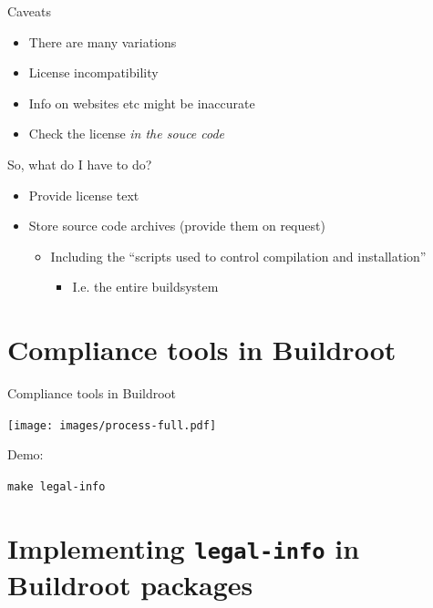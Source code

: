 \documentclass[xetex,table,table]{beamer}
\begin{document}
\begin{frame}{Caveats}
  \begin{itemize}
  \item There are many variations
  \item License incompatibility
  \item Info on websites etc might be inaccurate
  \item[\textrightarrow] Check the license {\em in the souce code}
  \end{itemize}
\end{frame}

\begin{frame}{So, what do I have to do?}
  \begin{itemize}
  \item Provide license text
  \item Store source code archives (provide them on request)
    \begin{itemize}
    \item Including the ``scripts used to control compilation and
      installation''
      \begin{itemize}
      \item I.e. the entire buildsystem
      \end{itemize}
    \end{itemize}
  \end{itemize}
\end{frame}


\section{Compliance tools in Buildroot}

\begin{frame}{Compliance tools in Buildroot}
  \begin{center}
    \texttt{[image: images/process-full.pdf]}
  \end{center}
\end{frame}

\begin{frame}[standout]
  Demo:

  {\tt make legal-info}
\end{frame}


\section[Implementing {\tt legal-info}\\in Buildroot packages]
        {Implementing {\tt legal-info}  in Buildroot packages}
\end{document}
